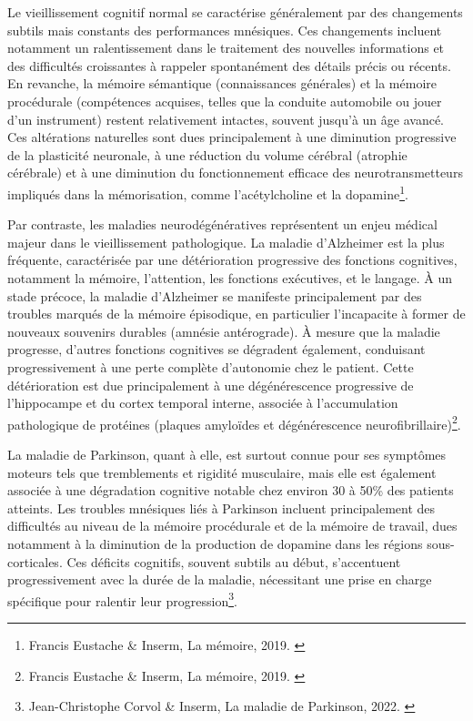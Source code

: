 \documentclass[11pt,a4paper]{report}
\begin{document}
Le vieillissement cognitif normal se caractérise généralement par des changements subtils mais constants des performances mnésiques. Ces changements incluent notamment un ralentissement dans le traitement des nouvelles informations et des difficultés croissantes à rappeler spontanément des détails précis ou récents. En revanche, la mémoire sémantique (connaissances générales) et la mémoire procédurale (compétences acquises, telles que la conduite automobile ou jouer d'un instrument) restent relativement intactes, souvent jusqu'à un âge avancé. Ces altérations naturelles sont dues principalement à une diminution progressive de la plasticité neuronale, à une réduction du volume cérébral (atrophie cérébrale) et à une diminution du fonctionnement efficace des neurotransmetteurs impliqués dans la mémorisation, comme l’acétylcholine et la dopamine\footnote{Francis Eustache \& Inserm, La mémoire, 2019.  \cite{inserm}}.

Par contraste, les maladies neurodégénératives représentent un enjeu médical majeur dans le vieillissement pathologique. La maladie d'Alzheimer est la plus fréquente, caractérisée par une détérioration progressive des fonctions cognitives, notamment la mémoire, l’attention, les fonctions exécutives, et le langage. À un stade précoce, la maladie d'Alzheimer se manifeste principalement par des troubles marqués de la mémoire épisodique, en particulier l’incapacite à former de nouveaux souvenirs durables (amnésie antérograde). À mesure que la maladie progresse, d'autres fonctions cognitives se dégradent également, conduisant progressivement à une perte complète d’autonomie chez le patient. Cette détérioration est due principalement à une dégénérescence progressive de l’hippocampe et du cortex temporal interne, associée à l’accumulation pathologique de protéines (plaques amyloïdes et dégénérescence neurofibrillaire)\footnote{Francis Eustache \& Inserm, La mémoire, 2019. \cite{inserm}}.

La maladie de Parkinson, quant à elle, est surtout connue pour ses symptômes moteurs tels que tremblements et rigidité musculaire, mais elle est également associée à une dégradation cognitive notable chez environ 30 à 50\% des patients atteints. Les troubles mnésiques liés à Parkinson incluent principalement des difficultés au niveau de la mémoire procédurale et de la mémoire de travail, dues notamment à la diminution de la production de dopamine dans les régions sous-corticales. Ces déficits cognitifs, souvent subtils au début, s’accentuent progressivement avec la durée de la maladie, nécessitant une prise en charge spécifique pour ralentir leur progression\footnote{Jean-Christophe Corvol \& Inserm, La maladie de Parkinson, 2022. \cite{inserm2}}.
\end{document}
